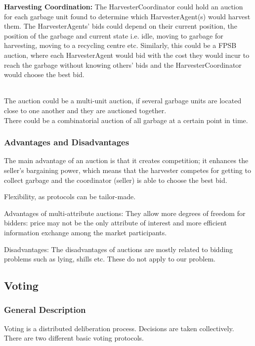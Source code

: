 \textbf{Harvesting Coordination:} The HarvesterCoordinator could hold an auction for each garbage unit found to determine which HarvesterAgent(s) would harvest them. The HarvesterAgents' bids could depend on their current position, the position of the garbage and current state i.e. idle, moving to garbage for harvesting, moving to a recycling centre etc. Similarly, this could be a FPSB auction, where each HarvesterAgent would bid with the cost they would incur to reach the garbage without knowing others' bids and the HarvesterCoordinator would choose the best bid. 

\\The auction could be a multi-unit auction, if several garbage units are located close to one another and they are auctioned together.
\\There could be a combinatorial auction of all garbage at a certain point in time.

\subsubsection{Advantages and Disadvantages}

The main advantage of an auction is that it creates competition; it enhances the seller's bargaining power, which means that the harvester competes for getting to collect garbage and the coordinator (seller) is able to choose the best bid.

Flexibility, as protocols can be tailor-made.

Advantages of multi-attribute auctions: They allow more degrees of freedom for bidders: price may not be the only attribute of interest and more efficient information exchange among the market participants.

Disadvantages:
The disadvantages of auctions are mostly related to bidding problems such as lying, shills etc. These do not apply to our problem. 


\subsection{Voting}

\subsubsection{General Description}

Voting is a distributed deliberation process. Decisions are taken collectively. There are two different basic voting protocols. 

